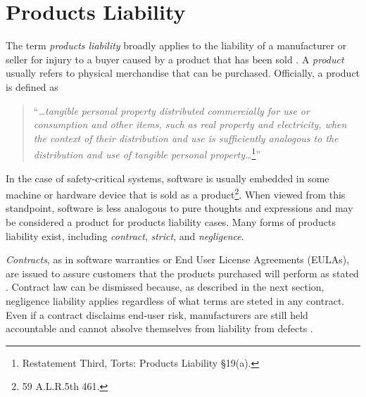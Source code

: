 \section{Products Liability}\label{S:Liability}
The term \textit{products liability} broadly applies to the liability of a
manufacturer or seller for injury to a buyer caused by a product that has been
sold \cite{Testing2005}. A \textit{product} usually refers to physical 
merchandise that can be purchased. Officially, a product is defined as 
\begin{quote}
``\textit{\ldots tangible personal property distributed commercially for use or
consumption and other items, such as real property and electricity, when the
context of their distribution and use is sufficiently analogous to the
distribution and use of tangible personal property\ldots}\footnote{Restatement
Third, Torts: Products Liability \S 19(a).}''
\end{quote}

In the case of safety-critical systems, software is usually embedded in
some machine or hardware device \cite{Leveson95} that is sold as a 
product\footnote{59 A.L.R.5th 461.}. When viewed from this standpoint, software
is less analogous to pure thoughts and expressions and may be considered a
product for products liability cases. Many forms of
products liability exist, including \textit{contract}, \textit{strict}, and
\textit{negligence}.

\textit{Contracts}, as in software warranties or End User License Agreements
(EULAs), are issued to assure customers that the products purchased will perform
as stated \cite{Armour93}. Contract law can be dismissed because, as described
in the next section, negligence liability applies regardless of what terms are
steted in any contract. Even if a contract disclaims end-user risk, 
manufacturers are still held accountable and cannot absolve themselves from
liability from defects \cite{Ryan03}.


